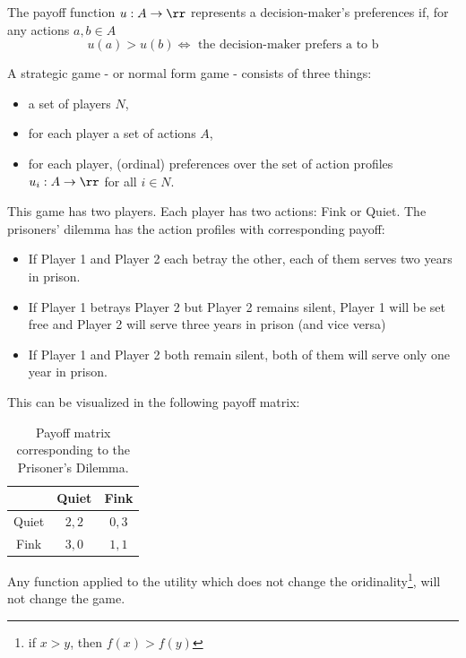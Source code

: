 \begin{definition}
      The payoff function $u : A \to \rr$ represents a decision-maker’s preferences if, for
      any actions $a, b \in A$
      $$u(a) > u(b) \iff \text{ the decision-maker prefers a to b}$$
\end{definition}

\begin{definition}
      A strategic game - or normal form game - consists of three things:
      \begin{itemize}[nosep]
            \item a set of players $N$,
            \item for each player a set of actions $A$,
            \item for each player, (ordinal) preferences over the set of action profiles $u_i : A \to \rr$ for all $i \in N$.
      \end{itemize}
\end{definition}


\begin{example}
      This game has two players. Each player has two actions: Fink or Quiet. The prisoners' dilemma has the action profiles with corresponding payoff:
      \begin{itemize}
            \item If Player 1 and Player 2 each betray the other, each of them serves two years in prison.
            \item If Player 1 betrays Player 2 but Player 2 remains silent, Player 1 will be set free and Player 2 will serve three years in prison (and vice versa)
            \item If Player 1 and Player 2 both remain silent, both of them will serve only one year in prison.
      \end{itemize}
      This can be visualized in the following payoff matrix:
      \begin{table}[h!]
            \begin{center}
                  \begin{tabular}{ c | c c }
                              & Quiet & Fink   \\ \hline
                        Quiet & $2,2$ & $0,3$  \\
                        Fink  & $3,0$ & $1, 1$
                  \end{tabular}
                  \vspace{-5pt}
                  \caption{Payoff matrix corresponding to the Prisoner's Dilemma.}
                  \vspace{-30pt}
            \end{center}
      \end{table}
\end{example}
\begin{theorem}
      Any function applied to the utility which does not change the oridinality\footnote{if $x > y$, then $f(x) > f(y)$}, will not change the game.
\end{theorem}


